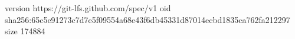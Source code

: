 version https://git-lfs.github.com/spec/v1
oid sha256:65c5e91273c7d7e5f09554a68e43f6db45331d87014ecbd1835ca762fa212297
size 174884
